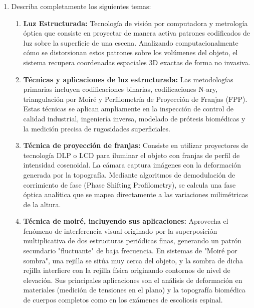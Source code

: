 \documentclass[12pt,a4paper]{article}
\begin{document}
\begin{enumerate}
		\item Describa completamente los siguientes temas:
		\begin{enumerate}
			\item \textbf{Luz Estructurada:} Tecnología de visión por computadora y metrología óptica que consiste en proyectar de manera activa patrones codificados de luz sobre la superficie de una escena. Analizando computacionalmente cómo se distorsionan estos patrones sobre los volúmenes del objeto, el sistema recupera coordenadas espaciales 3D exactas de forma no invasiva.
			\item \textbf{Técnicas y aplicaciones de luz estructurada:} Las metodologías primarias incluyen codificaciones binarias, codificaciones N-ary, triangulación por Moiré y Perfilometría de Proyección de Franjas (FPP). Estas técnicas se aplican ampliamente en la inspección de control de calidad industrial, ingeniería inversa, modelado de prótesis biomédicas y la medición precisa de rugosidades superficiales.
			\item \textbf{Técnica de proyección de franjas:} Consiste en utilizar proyectores de tecnología DLP o LCD para iluminar el objeto con franjas de perfil de intensidad cosenoidal. La cámara captura imágenes con la deformación generada por la topografía. Mediante algoritmos de demodulación de corrimiento de fase (Phase Shifting Profilometry), se calcula una fase óptica analítica que se mapea directamente a las variaciones milimétricas de la altura.
			\item \textbf{Técnica de moiré, incluyendo sus aplicaciones:} Aprovecha el fenómeno de interferencia visual originado por la superposición multiplicativa de dos estructuras periódicas finas, generando un patrón secundario "fluctuante" de baja frecuencia. En sistemas de "Moiré por sombra", una rejilla se sitúa muy cerca del objeto, y la sombra de dicha rejilla interfiere con la rejilla física originando contornos de nivel de elevación. Sus principales aplicaciones son el análisis de deformación en materiales (medición de tensiones en el plano) y la topografía biomédica de cuerpos completos como en los exámenes de escoliosis espinal.
		\end{enumerate}
		

\end{enumerate}
\end{document}
